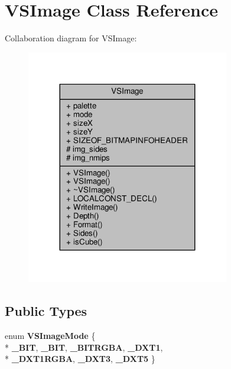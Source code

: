 \hypertarget{classVSImage}{}\section{V\+S\+Image Class Reference}
\label{classVSImage}


Collaboration diagram for V\+S\+Image\+:
\nopagebreak
\begin{figure}[H]
\begin{center}
\leavevmode
\includegraphics[width=251pt]{d6/d20/classVSImage__coll__graph}
\end{center}
\end{figure}
\subsection*{Public Types}
\begin{DoxyCompactItemize}
\item 
enum {\bfseries V\+S\+Image\+Mode} \{ \\*
{\bfseries \+\_\+B\+IT}, 
{\bfseries \+\_\+B\+IT}, 
{\bfseries \+\_\+B\+I\+T\+R\+G\+BA}, 
{\bfseries \+\_\+\+D\+X\+T1}, 
\\*
{\bfseries \+\_\+\+D\+X\+T1\+R\+G\+BA}, 
{\bfseries \+\_\+\+D\+X\+T3}, 
{\bfseries \+\_\+\+D\+X\+T5}
 \}\hypertarget{classVSImage_aef5081d7ab94591c11b0f70601e4ecd2}{}\label{classVSImage_aef5081d7ab94591c11b0f70601e4ecd2}

\end{DoxyCompactItemize}
